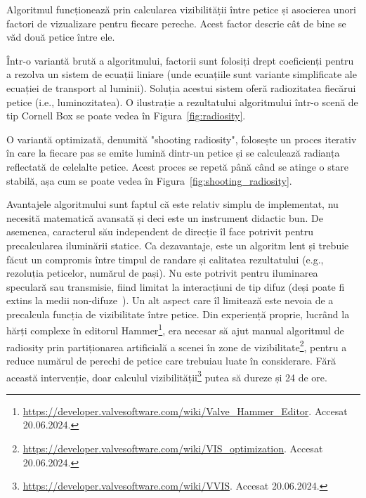 \documentclass[12pt,a4paper]{report}
\numberwithin{equation}{section} %
\begin{document}
Algoritmul funcționează prin calcularea vizibilității între petice și asocierea
unori factori de vizualizare pentru fiecare pereche. Acest factor descrie
cât de bine se văd două petice între ele.

Într-o variantă brută a algoritmului, factorii sunt folosiți drept coeficienți pentru a rezolva
un sistem de ecuații liniare (unde ecuațiile sunt variante simplificate ale ecuației
de transport al luminii). Soluția acestui sistem oferă radiozitatea fiecărui petice
(i.e., luminozitatea). O ilustrație a rezultatului algoritmului într-o scenă
de tip Cornell Box se poate vedea în Figura~\ref{fig:radiosity}.

O variantă optimizată, denumită "shooting radiosity", folosește un proces iterativ în
care la fiecare pas se emite lumină dintr-un petice și se calculează radianța
reflectată de celelalte petice. Acest proces se repetă până când se atinge o stare
stabilă, așa cum se poate vedea în Figura~\ref{fig:shooting_radiosity}.

Avantajele algoritmului sunt faptul că este relativ simplu de implementat, nu necesită
matematică avansată și deci este un instrument didactic bun. De asemenea, caracterul
său independent de direcție îl face potrivit pentru precalcularea iluminării statice.
Ca dezavantaje, este un algoritm lent și trebuie făcut un compromis între timpul de
randare și calitatea rezultatului (e.g., rezoluția peticelor, numărul de pași). Nu este
potrivit pentru iluminarea speculară sau transmisie, fiind limitat la interacțiuni de tip difuz
(deși poate fi extins la medii non-difuze~\cite{Immel}).
Un alt aspect care îl limitează este nevoia de a precalcula funcția de vizibilitate între petice.
Din experiență proprie, lucrând la hărți complexe în editorul Hammer\footnote{\url{https://developer.valvesoftware.com/wiki/Valve_Hammer_Editor}. Accesat 20.06.2024.},
era necesar să ajut manual algoritmul de radiosity prin partiționarea artificială a
scenei în zone de vizibilitate\footnote{\url{https://developer.valvesoftware.com/wiki/VIS_optimization}. Accesat 20.06.2024.}, pentru a reduce numărul de perechi de petice care
trebuiau luate în considerare. Fără această intervenție, doar calculul vizibilității\footnote{\url{https://developer.valvesoftware.com/wiki/VVIS}. Accesat 20.06.2024.}
putea să dureze și 24 de ore.
\end{document}
